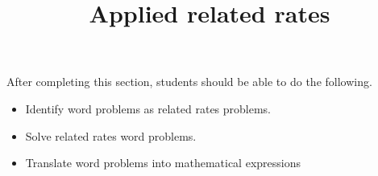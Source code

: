 \documentclass{ximera}
\title{Applied related rates}
\begin{document}
\begin{abstract}
\end{abstract}

\maketitle

\begin{sectionOutcomes}

After completing this section, students should be able to do the following.

\begin{itemize}
\item Identify word problems as related rates problems.
\item Solve related rates word problems.
\item Translate word problems into mathematical expressions
\end{itemize}

\end{sectionOutcomes}
\end{document}
